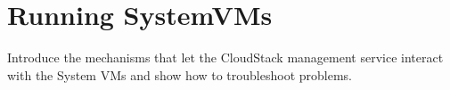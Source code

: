 \section{Running SystemVMs}
Introduce the mechanisms that let the CloudStack management service interact with the System VMs and show how to troubleshoot problems.

